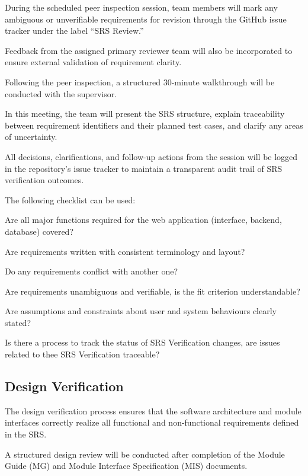 \documentclass[12pt, titlepage]{article}
\begin{document}
During the scheduled peer inspection session, team members will mark any
ambiguous or unverifiable requirements for revision through the GitHub issue
tracker under the label ``SRS Review.''

Feedback from the assigned primary reviewer team will also be incorporated to
ensure external validation of requirement clarity.

Following the peer inspection, a structured 30-minute walkthrough will be
conducted with the supervisor.

In this meeting, the team will present the SRS structure, explain traceability
between requirement identifiers and their planned test cases, and clarify any
areas of uncertainty.

All decisions, clarifications, and follow-up actions from the session will be
logged in the repository’s issue tracker to maintain a transparent audit trail
of SRS verification outcomes.

The following checklist can be used:
\begin{todolist}
  \item Are all major functions required for the web application (interface, backend, database) covered?
  \item Are requirements written with consistent terminology and layout?
  \item Do any requirements conflict with another one?
  \item Are requirements unambiguous and verifiable, is the fit criterion understandable?
  \item Are assumptions and constraints about user and system behaviours clearly stated?
  \item Is there a process to track the status of SRS Verification changes, are issues related to thee SRS Verification traceable?
\end{todolist}

\subsection{Design Verification}
\label{subsec:design-verification}
The design verification process ensures that the software architecture and
module interfaces correctly realize all functional and non-functional
requirements defined in the SRS.

A structured design review will be conducted after completion of the Module
Guide (MG) and Module Interface Specification (MIS) documents.
\end{document}
